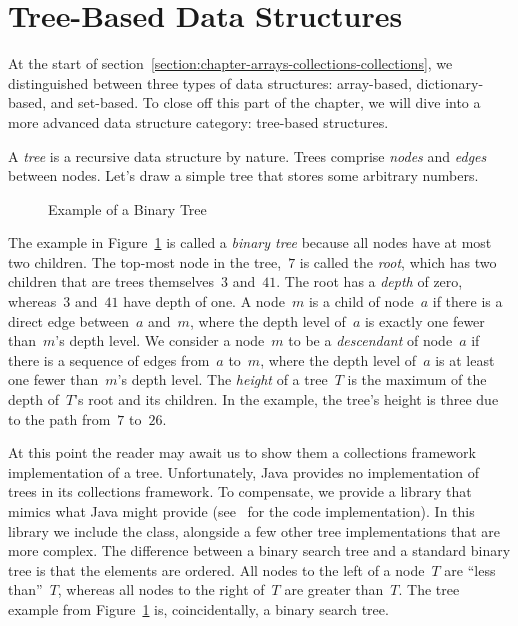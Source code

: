 \section{Tree-Based Data Structures}
At the start of section~\ref{section:chapter-arrays-collections-collections}, we distinguished between three types of data structures: array-based, dictionary-based, and set-based. 
To close off this part of the chapter, we will dive into a more advanced data structure category: tree-based structures.

A \emph{tree} is a recursive data structure by nature. 
Trees comprise \emph{nodes} and \emph{edges} between nodes. 
Let's draw a simple tree that stores some arbitrary numbers.

\begin{figure}[ht]
\centering
{}
\caption{Example of a Binary Tree}
\label{fig:binarytree}
\end{figure}

The example in Figure~\ref{fig:binarytree} is called a \emph{binary tree} because all nodes have at most two children. 
The top-most node in the tree,~$7$ is called the \emph{root}, which has two children that are trees themselves~$3$ and~$41$. 
The root has a \emph{depth} of zero, whereas~$3$ and~$41$ have depth of one. 
A node~$m$ is a child of node~$a$ if there is a direct edge between~$a$ and~$m$, where the depth level of~$a$ is exactly one fewer than~$m$'s depth level. 
We consider a node~$m$ to be a \emph{descendant} of node~$a$ if there is a sequence of edges from~$a$ to~$m$, where the depth level of~$a$ is at least one fewer than~$m$'s depth level. 
The \emph{height} of a tree~$T$ is the maximum of the depth of~$T$'s root and its children. 
In the example, the tree's height is three due to the path from~$7$ to~$26$.

At this point the reader may await us to show them a collections framework implementation of a tree. 
Unfortunately, Java provides no implementation of trees in its collections framework. 
To compensate, we provide a library that mimics what Java might provide (see~ for the code implementation). 
In this library we include the  class, alongside a few other tree implementations that are more complex. 
The difference between a binary search tree and a standard binary tree is that the elements are ordered. 
All nodes to the left of a node~$T$ are ``less than''~$T$, whereas all nodes to the right of~$T$ are greater than~$T$.
The tree example from Figure~\ref{fig:binarytree} is, coincidentally, a binary search tree.

